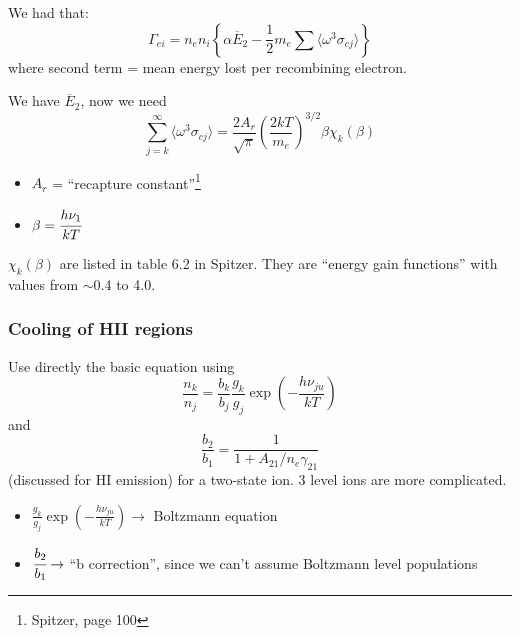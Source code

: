 \documentclass[11pt]{article}
\begin{document}
We had that:
\[
    \Gamma_{ei} = n_{e}n_{i}\left\{\alpha\overline{E}_{2}
    - \frac{1}{2}m_{e}\sum{ \langle \omega^{3}\sigma_{cj} \rangle }\right\}
    \]
where second term = mean energy lost per recombining electron.

We have $\overline{E}_{2}$, now we need
\[
    \sum_{j=k}^{\infty}{ \langle \omega^{3}\sigma_{cj} \rangle }
    = \frac{2A_{r}}{\sqrt{\pi}} \left(\frac{2kT}{m_{e}}\right)^{3/2}
    \beta\chi_{k}(\beta)
    \]
\begin{itemize}
    \item $A_{r}$ = ``recapture constant''\footnote{Spitzer, page 100}
    \item $\beta = \cfrac{h\nu_{1}}{kT}$
\end{itemize}
$\chi_{k}(\beta)$ are listed in table 6.2 in Spitzer.
They are ``energy gain functions'' with values from $\sim$0.4 to 4.0.

\subsubsection{Cooling of HII regions}
Use directly the basic equation using
\[
    \frac{n_{k}}{n_{j}} = \frac{b_{k}}{b_{j}}
    \frac{g_{k}}{g_{j}}\exp\left(-\frac{h\nu_{ju}}{kT}\right)
    \]
and
\[
    \frac{b_{2}}{b_{1}} = \frac{1}{1 + A_{21}/n_{e}\gamma_{21}}
    \]
(discussed for HI emission) for a two-state ion.
3 level ions are more complicated.
\begin{itemize}
    \item $\frac{g_{k}}{g_{j}}\exp\left(-\frac{h\nu_{ju}}{kT}\right)
        \rightarrow$ Boltzmann equation
    \item $\cfrac{b_{2}}{b_{1}} \rightarrow$ ``b correction'', since we
        can't assume Boltzmann level populations
\end{itemize}
\end{document}
